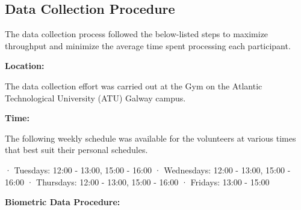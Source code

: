 \subsection{Data Collection Procedure}

The data collection process followed the below-listed steps to maximize throughput and minimize the average time spent processing each participant.

\textbf{Location:}

The data collection effort was carried out at the Gym on the Atlantic Technological University (ATU) Galway campus.

\textbf{Time:}

The following weekly schedule was available for the volunteers at various times that best suit their personal schedules.

· Tuesdays: 12:00 - 13:00, 15:00 - 16:00
· Wednesdays: 12:00 - 13:00, 15:00 - 16:00
· Thursdays: 12:00 - 13:00, 15:00 - 16:00
· Fridays: 13:00 - 15:00

\textbf{Biometric Data Procedure:}


